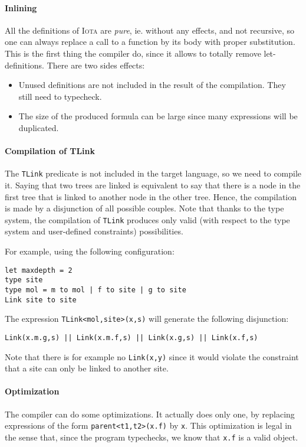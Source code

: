 \documentclass[10pt,a4paper]{article}
\newcommand\Iota{\textsc{Iota}}
\newcommand{\ocaml}{\texttt}
\begin{document}
\paragraph{Inlining}
All the definitions of \Iota{} are \emph{pure}, ie. without any effects, and not recursive, so one can always replace a call to a function by its body with proper substitution. This is the first thing the compiler do, since it allows to totally remove let-definitions. There are two sides effects:

\begin{itemize}
\item Unused definitions are not included in the result of the compilation. They still need to typecheck.
\item The size of the produced formula can be large since many expressions will be duplicated.
\end{itemize}

\paragraph{Compilation of TLink}
\label{para:tlink}
The \ocaml{TLink} predicate is not included in the target language, so we need to compile it.
Saying that two trees are linked is equivalent to say that there is a node in the first tree that is linked to another node in the other tree. Hence, the compilation is made by a disjunction of all possible couples.
Note that thanks to the type system, the compilation of \ocaml{TLink} produces only valid (with respect to the type system and user-defined constraints) possibilities.

For example, using the following configuration:
\begin{verbatim}
let maxdepth = 2
type site
type mol = m to mol | f to site | g to site
Link site to site
\end{verbatim}

The expression \ocaml{TLink<mol,site>(x,s)} will generate the following disjunction:
\begin{verbatim}
Link(x.m.g,s) || Link(x.m.f,s) || Link(x.g,s) || Link(x.f,s)
\end{verbatim}

Note that there is for example no \ocaml{Link(x,y)} since it would violate the constraint that a site can only be linked to another site.

\paragraph{Optimization}
The compiler can do some optimizations. It actually does only one, by replacing expressions of the form
\ocaml{parent<t1,t2>(x.f)} by \ocaml{x}.
This optimization is legal in the sense that, since the program typechecks, we know that \ocaml{x.f} is a valid object.
\end{document}
